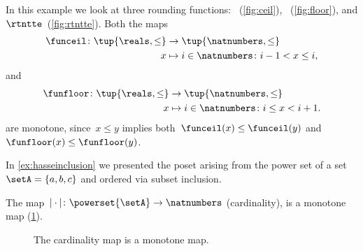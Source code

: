 \begin{figure}[h!]
\end{figure}

\begin{example}
	\label{ex:rounding-functions}
	In this example we look at three rounding functions: \funceil~(\cref{fig:ceil}), \funfloor~(\cref{fig:floor}), and $\rtntte$~(\cref{fig:rtntte}).
	Both the maps
	\begin{equation*}
		\begin{aligned}
			\funceil\colon \tup{\reals,\leq} & \to \tup{\natnumbers,\leq}                    \\
			x                                & \mapsto i \in \natnumbers \colon i-1<x\leq i,
		\end{aligned}
	\end{equation*}
	and
	\begin{equation*}
		\begin{aligned}
			\funfloor\colon \tup{\reals,\leq} & \to \tup{\natnumbers,\leq}                     \\
			x                                 & \mapsto i \in \natnumbers \colon i\leq x< i+1.
		\end{aligned}
	\end{equation*}
	are monotone, since~$x\leq y$ implies both~$\funceil(x)\leq \funceil(y)$ and~$\funfloor(x)\leq\funfloor(y)$.
	\begin{figure*}[h!]
		\centering
		\hfill
		\hfill
	\end{figure*}
\end{example}

\begin{example}
	In \cref{ex:hasseinclusion} we presented the poset arising from the power set of a set~$\setA=\{a,b,c\}$ and ordered via subset inclusion.

	The map~$\vert \cdot \vert \colon \powerset{\setA} \to \natnumbers$ (cardinality), is a monotone map (\cref{fig:cardinality}).
	\begin{figure}[h!]
		\centering
		\caption{The cardinality map is a monotone map. }
		\label{fig:cardinality}
	\end{figure}
\end{example}

